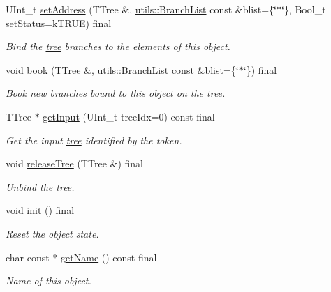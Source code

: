 \begin{DoxyCompactItemize}
UInt\_\-t \hyperlink{classpanda_1_1Element_a0f4c9e587ee4c4ccbc27b76b06adbc80}{setAddress} (TTree \&, \hyperlink{classpanda_1_1utils_1_1BranchList}{utils::BranchList} const \&blist=\{\char`\"{}$\ast$\char`\"{}\}, Bool\_\-t setStatus=kTRUE) final
\begin{DoxyCompactList}\small\item\em Bind the \hyperlink{namespacepanda_1_1tree}{tree} branches to the elements of this object. \item\end{DoxyCompactList}\item 
void \hyperlink{classpanda_1_1Element_abc35d69770d86c6c22cb38902383f82a}{book} (TTree \&, \hyperlink{classpanda_1_1utils_1_1BranchList}{utils::BranchList} const \&blist=\{\char`\"{}$\ast$\char`\"{}\}) final
\begin{DoxyCompactList}\small\item\em Book new branches bound to this object on the \hyperlink{namespacepanda_1_1tree}{tree}. \item\end{DoxyCompactList}\item 
TTree $\ast$ \hyperlink{classpanda_1_1Element_a015e9911602ca22405225d0584c39de3}{getInput} (UInt\_\-t treeIdx=0) const final
\begin{DoxyCompactList}\small\item\em Get the input \hyperlink{namespacepanda_1_1tree}{tree} identified by the token. \item\end{DoxyCompactList}\item 
void \hyperlink{classpanda_1_1Element_a526ce926da6ed144bcf41a43e906f91b}{releaseTree} (TTree \&) final
\begin{DoxyCompactList}\small\item\em Unbind the \hyperlink{namespacepanda_1_1tree}{tree}. \item\end{DoxyCompactList}\item 
void \hyperlink{classpanda_1_1Element_a5f48aa34efdae52533235d9703814de1}{init} () final
\begin{DoxyCompactList}\small\item\em Reset the object state. \item\end{DoxyCompactList}\item 
char const $\ast$ \hyperlink{classpanda_1_1Element_a258c5be022395f98b13120cdab80fb51}{getName} () const final
\begin{DoxyCompactList}\small\item\em Name of this object. \item\end{DoxyCompactList}\item 

\end{DoxyCompactItemize}
